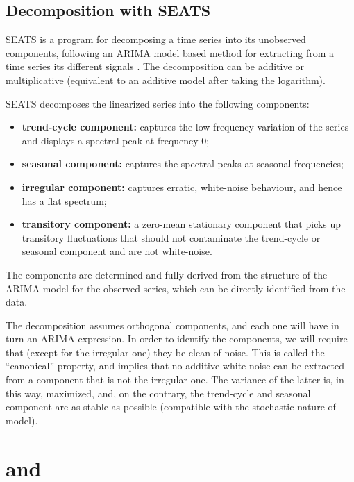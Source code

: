 \documentclass[article]{jss}
\providecommand{\tightlist}{%
  \setlength{\itemsep}{0pt}\setlength{\parskip}{0pt}}
\begin{document}
\hypertarget{sa-seats}{%
\subsection{Decomposition with SEATS}\label{sa-seats}}

SEATS is a program for decomposing a time series into its unobserved
components, following an ARIMA model based method for extracting from a
time series its different signals
\citep{gomez1996programs, caporello2004program}. The decomposition can
be additive or multiplicative (equivalent to an additive model after
taking the logarithm).

SEATS decomposes the linearized series into the following components:

\begin{itemize}
\tightlist
\item
  \textbf{trend-cycle component:} captures the low-frequency variation
  of the series and displays a spectral peak at frequency 0;\\
\item
  \textbf{seasonal component:} captures the spectral peaks at seasonal
  frequencies;\\
\item
  \textbf{irregular component:} captures erratic, white-noise behaviour,
  and hence has a flat spectrum;\\
\item
  \textbf{transitory component:} a zero-mean stationary component that
  picks up transitory fluctuations that should not contaminate the
  trend-cycle or seasonal component and are not white-noise.
\end{itemize}

The components are determined and fully derived from the structure of
the ARIMA model for the observed series, which can be directly
identified from the data.

The decomposition assumes orthogonal components, and each one will have
in turn an ARIMA expression. In order to identify the components, we
will require that (except for the irregular one) they be clean of noise.
This is called the ``canonical'' property, and implies that no additive
white noise can be extracted from a component that is not the irregular
one. The variance of the latter is, in this way, maximized, and, on the
contrary, the trend-cycle and seasonal component are as stable as
possible (compatible with the stochastic nature of model).

\section[JDemetra+ and RJDemetra]{ and }
\end{document}
